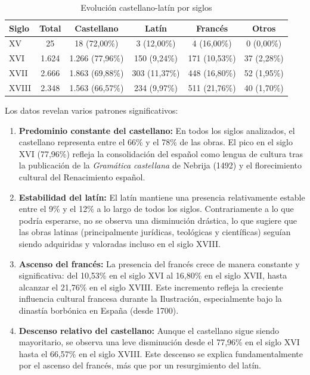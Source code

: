 \documentclass[12pt,a4paper]{article}
\begin{document}
\begin{table}[h]
\centering
\caption{Evolución castellano-latín por siglos}
\label{tab:evolucion}
\begin{tabular}{lccccc}
\toprule
\textbf{Siglo} & \textbf{Total} & \textbf{Castellano} & \textbf{Latín} & \textbf{Francés} & \textbf{Otros} \\
\midrule
XV & 25 & 18 (72,00\%) & 3 (12,00\%) & 4 (16,00\%) & 0 (0,00\%) \\
XVI & 1.624 & 1.266 (77,96\%) & 150 (9,24\%) & 171 (10,53\%) & 37 (2,28\%) \\
XVII & 2.666 & 1.863 (69,88\%) & 303 (11,37\%) & 448 (16,80\%) & 52 (1,95\%) \\
XVIII & 2.348 & 1.563 (66,57\%) & 234 (9,97\%) & 511 (21,76\%) & 40 (1,70\%) \\
\bottomrule
\end{tabular}
\end{table}

Los datos revelan varios patrones significativos:

\begin{enumerate}
    \item \textbf{Predominio constante del castellano:} En todos los siglos analizados, el castellano representa entre el 66\% y el 78\% de las obras. El pico en el siglo XVI (77,96\%) refleja la consolidación del español como lengua de cultura tras la publicación de la \textit{Gramática castellana} de Nebrija (1492) y el florecimiento cultural del Renacimiento español.

    \item \textbf{Estabilidad del latín:} El latín mantiene una presencia relativamente estable entre el 9\% y el 12\% a lo largo de todos los siglos. Contrariamente a lo que podría esperarse, no se observa una disminución drástica, lo que sugiere que las obras latinas (principalmente jurídicas, teológicas y científicas) seguían siendo adquiridas y valoradas incluso en el siglo XVIII.

    \item \textbf{Ascenso del francés:} La presencia del francés crece de manera constante y significativa: del 10,53\% en el siglo XVI al 16,80\% en el siglo XVII, hasta alcanzar el 21,76\% en el siglo XVIII. Este incremento refleja la creciente influencia cultural francesa durante la Ilustración, especialmente bajo la dinastía borbónica en España (desde 1700).

    \item \textbf{Descenso relativo del castellano:} Aunque el castellano sigue siendo mayoritario, se observa una leve disminución desde el 77,96\% en el siglo XVI hasta el 66,57\% en el siglo XVIII. Este descenso se explica fundamentalmente por el ascenso del francés, más que por un resurgimiento del latín.
\end{enumerate}
\end{document}
